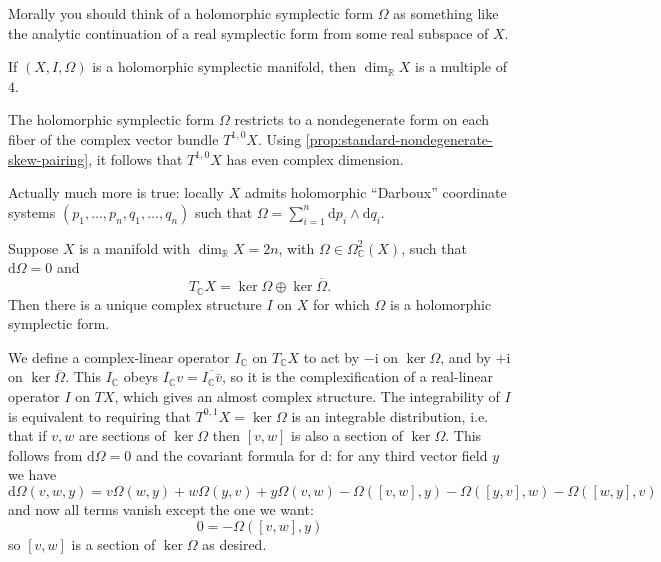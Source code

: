 \documentclass[12pt,letterpaper,reqno]{article}
\numberwithin{equation}{section}
\newcommand{\R}{\ensuremath{\mathbb R}}
\newcommand{\C}{\ensuremath{\mathbb C}}
\newcommand{\I}{{\mathrm i}}
\newcommand{\de}{\mathrm{d}}
\begin{document}
Morally you should think of a holomorphic symplectic form $\Omega$
as something like the analytic continuation of a real
symplectic form from some real subspace of $X$.

\begin{prop}
\label{prop:hol-symp-dimension-4n} If $(X,I,\Omega)$ is a holomorphic symplectic manifold,
then $\dim_\R X$ is a multiple of $4$.
\end{prop}
\begin{pf} The holomorphic symplectic form $\Omega$ restricts to a nondegenerate form on each fiber of the complex vector
bundle $T^{1,0} X$.
Using \autoref{prop:standard-nondegenerate-skew-pairing}, it follows
that $T^{1,0} X$ has even complex dimension.
\end{pf}

Actually much more is true:
locally $X$ admits holomorphic ``Darboux'' coordinate systems
$(p_1, \dots, p_n, q_1, \dots, q_n)$
such that $\Omega = \sum_{i=1}^n \de p_i \wedge \de q_i$.

\begin{prop} \label{prop:hol-symp-to-complex}
Suppose $X$ is a manifold with $\dim_\R X = 2n$,
with $\Omega \in \Omega^2_\C(X)$, such that $\de \Omega = 0$ and
\begin{equation}
 T_\C X = \ker \Omega \oplus \ker \overline\Omega.
\end{equation}
Then there is a
unique complex structure $I$ on $X$ for which $\Omega$
is a holomorphic symplectic form.
\end{prop}
\begin{pf} We define a complex-linear operator
$I_\C$ on $T_\C X$ to act by $-\I$ on
$\ker \Omega$, and by $+\I$ on $\ker \overline\Omega$.
This $I_\C$ obeys $I_\C v = \overline{I_\C \bar{v}}$, so it is the
complexification of a real-linear operator $I$ on $TX$,
which gives an almost complex structure.
The integrability of $I$ is equivalent to requiring
that $T^{0,1} X = \ker \Omega$ is an integrable distribution,
i.e. that if $v,w$ are sections of $\ker \Omega$ then $[v,w]$
is also a section of $\ker \Omega$.
This follows from $\de \Omega = 0$ and the covariant formula
for $\de$: for any third vector field $y$ we have
\begin{equation}
  \de \Omega(v,w,y) = v \Omega(w,y) + w \Omega(y,v) + y \Omega(v,w)
  - \Omega([v,w],y) - \Omega([y,v],w) - \Omega([w,y],v)
\end{equation}
and now all terms vanish except the one we want:
\begin{equation}
  0 = -\Omega([v,w],y)
\end{equation}
so $[v,w]$ is a section of $\ker \Omega$ as desired.
\end{pf}
\end{document}
